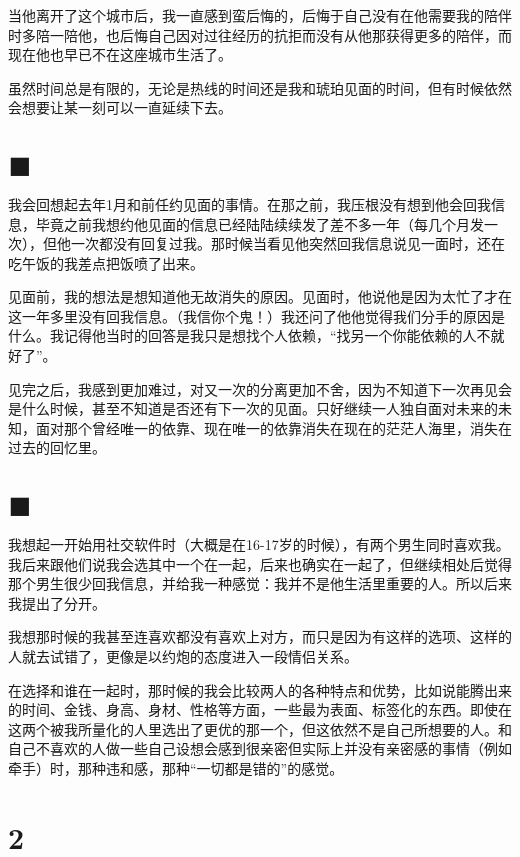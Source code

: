 当他离开了这个城市后，我一直感到蛮后悔的，后悔于自己没有在他需要我的陪伴时多陪一陪他，也后悔自己因对过往经历的抗拒而没有从他那获得更多的陪伴，而现在他也早已不在这座城市生活了。

虽然时间总是有限的，无论是热线的时间还是我和琥珀见面的时间，但有时候依然会想要让某一刻可以一直延续下去。

\section*{$\blacksquare$}

我会回想起去年1月和前任约见面的事情。在那之前，我压根没有想到他会回我信息，毕竟之前我想约他见面的信息已经陆陆续续发了差不多一年（每几个月发一次），但他一次都没有回复过我。那时候当看见他突然回我信息说见一面时，还在吃午饭的我差点把饭喷了出来。

见面前，我的想法是想知道他无故消失的原因。见面时，他说他是因为太忙了才在这一年多里没有回我信息。（我信你个鬼！）我还问了他他觉得我们分手的原因是什么。我记得他当时的回答是我只是想找个人依赖，“找另一个你能依赖的人不就好了”。

见完之后，我感到更加难过，对又一次的分离更加不舍，因为不知道下一次再见会是什么时候，甚至不知道是否还有下一次的见面。只好继续一人独自面对未来的未知，面对那个曾经唯一的依靠、现在唯一的依靠消失在现在的茫茫人海里，消失在过去的回忆里。

\section*{$\blacksquare$}

我想起一开始用社交软件时（大概是在16-17岁的时候），有两个男生同时喜欢我。我后来跟他们说我会选其中一个在一起，后来也确实在一起了，但继续相处后觉得那个男生很少回我信息，并给我一种感觉：我并不是他生活里重要的人。所以后来我提出了分开。

我想那时候的我甚至连喜欢都没有喜欢上对方，而只是因为有这样的选项、这样的人就去试错了，更像是以约炮的态度进入一段情侣关系。

在选择和谁在一起时，那时候的我会比较两人的各种特点和优势，比如说能腾出来的时间、金钱、身高、身材、性格等方面，一些最为表面、标签化的东西。即使在这两个被我所量化的人里选出了更优的那一个，但这依然不是自己所想要的人。和自己不喜欢的人做一些自己设想会感到很亲密但实际上并没有亲密感的事情（例如牵手）时，那种违和感，那种“一切都是错的”的感觉。

\section*{2}

